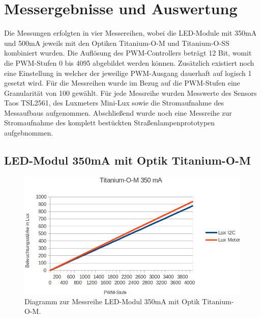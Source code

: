 \documentclass[a4paper,12pt]{scrartcl}
\begin{document}
\clearpage
\section{Messergebnisse und Auswertung}
Die Messungen erfolgten in vier Messereihen, wobei die LED-Module mit 350mA und 500mA jeweils mit den Optiken Titanium-O-M und Titanium-O-SS kombiniert wurden.
Die Auflösung des PWM-Controllers beträgt 12 Bit, womit die PWM-Stufen 0 bis 4095 abgebildet werden können. Zusätzlich existiert noch eine Einstellung in
welcher der jeweilige PWM-Ausgang dauerhaft auf logisch 1 gesetzt wird. Für die Messreihen wurde im Bezug auf die PWM-Stufen eine Granularität von 100 gewählt.
Für jede Messreihe wurden Messwerte  des Sensors Taos TSL2561, des Luxmeters Mini-Lux sowie die Stromaufnahme des Messaufbaus aufgenommen.
Abschließend wurde noch eine Messreihe zur Stromaufnahme des komplett bestückten Straßenlampenprototypen aufgebnommen.

\subsection{LED-Modul 350mA mit Optik Titanium-O-M}

\begin{figure}[H]
  \begin{center}
    \includegraphics[width=1\hsize]{./images/350-m-print.png}
  \end{center}
\caption[Diagramm zur Messreihe LED-Modul 350mA mit Optik Titanium-O-M]{\label{diagram350matitm}Diagramm zur Messreihe LED-Modul 350mA mit Optik
Titanium-O-M.}
\end{figure}
\end{document}
